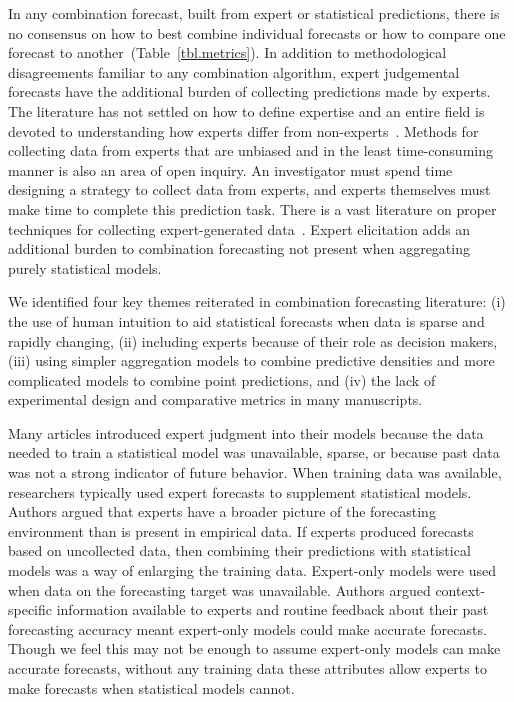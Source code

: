\documentclass[preprint,authoryear]{elsarticle}
\begin{document}
In any combination forecast, built from expert or statistical predictions, there is no consensus on how to best combine individual forecasts or how to compare one forecast to another~(Table~\ref{tbl.metrics}).
In addition to methodological disagreements familiar to any combination algorithm, expert judgemental forecasts have the additional burden of collecting predictions made by experts.
The literature has not settled on how to define expertise and an entire field is devoted to understanding how experts differ from non-experts~\citep{dawid1995coherent,farrington2006nature,ericsson2007capturing,rikers2005recent,de2014thought}.
Methods for collecting data from experts that are unbiased and in the least time-consuming manner is also an area of open inquiry.
An investigator must spend time designing a strategy to collect data from experts, and experts themselves must make time to complete this prediction task. 
There is a vast literature on proper techniques for collecting expert-generated data~\citep{ayyub2001elicitation,yousuf2007using,powell2003delphi,normand1998eliciting,leal2007eliciting,martin2012eliciting}.
Expert elicitation adds an additional burden to combination forecasting not present when aggregating purely statistical models.

We identified four key themes reiterated in combination forecasting literature: (i) the use of human intuition to aid statistical forecasts when data is sparse and rapidly changing, (ii) including experts because of their role as decision makers, (iii) using simpler aggregation models to combine predictive densities and more complicated models to combine point predictions, and (iv) the lack of experimental design and comparative metrics in many manuscripts.

Many articles introduced expert judgment into their models because the data needed to train a statistical model was unavailable, sparse, or because past data was not a strong indicator of future behavior.
When training data was available, researchers typically used expert forecasts to supplement statistical models.
Authors argued that experts have a broader picture of the forecasting environment than is present in empirical data. 
If experts produced forecasts based on uncollected data, then combining their predictions with statistical models was a way of enlarging the training data. 
Expert-only models were used when data on the forecasting target was unavailable.
Authors argued context-specific information available to experts and routine feedback about their past forecasting accuracy meant expert-only models could make accurate forecasts.
Though we feel this may not be enough to assume expert-only models can make accurate forecasts, without any training data these attributes allow experts to make forecasts when statistical models cannot.
\end{document}
